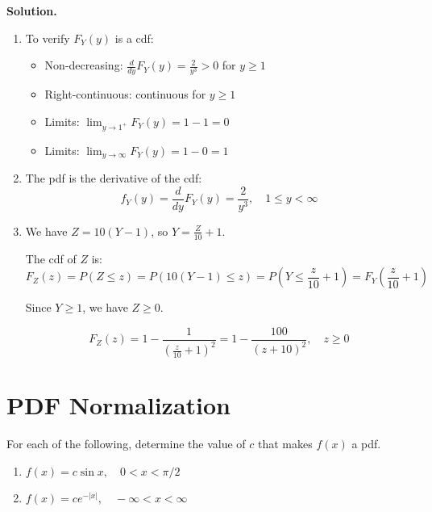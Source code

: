 \noindent\textbf{Solution.}
\begin{enumerate}[label=(\alph*)]
    \item To verify $F_Y(y)$ is a cdf:
    
    \begin{itemize}
    \item Non-decreasing: $\frac{d}{dy}F_Y(y) = \frac{2}{y^3} > 0$ for $y \geq 1$
    \item Right-continuous: continuous for $y \geq 1$
    \item Limits: $\lim_{y \to 1^+} F_Y(y) = 1 - 1 = 0$
    \item Limits: $\lim_{y \to \infty} F_Y(y) = 1 - 0 = 1$
    \end{itemize}
    
    \item The pdf is the derivative of the cdf:
    \[ f_Y(y) = \frac{d}{dy}F_Y(y) = \frac{2}{y^3}, \quad 1 \leq y < \infty \]
    
    \item We have $Z = 10(Y - 1)$, so $Y = \frac{Z}{10} + 1$.
    
    The cdf of $Z$ is:
    \[ F_Z(z) = P(Z \leq z) = P(10(Y - 1) \leq z) = P(Y \leq \frac{z}{10} + 1) = F_Y(\frac{z}{10} + 1) \]
    
    Since $Y \geq 1$, we have $Z \geq 0$.
    
    \[ F_Z(z) = 1 - \frac{1}{(\frac{z}{10} + 1)^2} = 1 - \frac{100}{(z + 10)^2}, \quad z \geq 0 \]
\end{enumerate}


\section{PDF Normalization}

\begin{problembox}
For each of the following, determine the value of $c$ that makes $f(x)$ a pdf.
\begin{enumerate}[label=(\alph*)]
    \item $f(x) = c \sin x, \quad 0 < x < \pi/2$
    \item $f(x) = ce^{-|x|}, \quad -\infty < x < \infty$
\end{enumerate}
\end{problembox}

